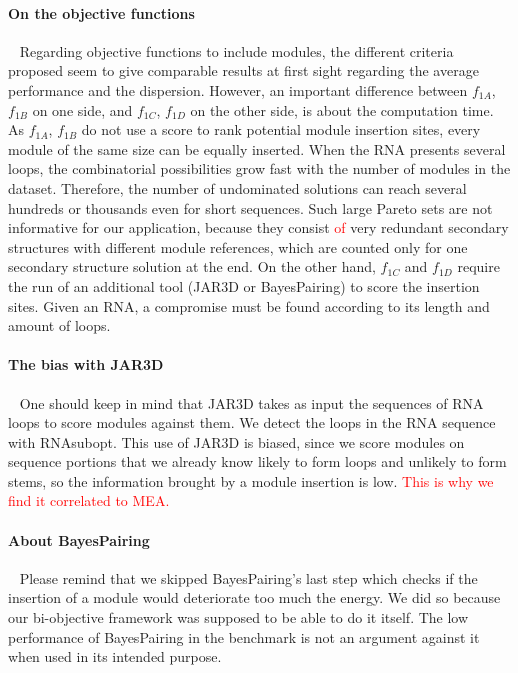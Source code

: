 \documentclass{bioinfo}
\begin{document}
\paragraph{On the objective functions} ~ 
Regarding objective functions to include modules, the different criteria proposed seem to give comparable results at first sight regarding the average performance and the dispersion. However, an important difference between $f_{1A}$, $f_{1B}$ on one side, and $f_{1C}$, $f_{1D}$ on the other side, is about the computation time. As $f_{1A}$, $f_{1B}$ do not use a score to rank potential module insertion sites, every module of the same size can be equally inserted. When the RNA presents several loops, the combinatorial possibilities grow fast with the number of modules in the dataset. Therefore, the number of undominated solutions can reach several hundreds or thousands even for short sequences. Such large Pareto sets are not informative for our application, because they consist \textcolor{red}{of} very redundant secondary structures with different module references, which are counted only for one secondary structure solution at the end. On the other hand, $f_{1C}$ and $f_{1D}$ require the run of an additional tool (JAR3D or BayesPairing) to score the insertion sites. Given an RNA, a compromise must be found according to its length and amount of loops.

\paragraph{The bias with JAR3D} ~ One should keep in mind that JAR3D takes as input the sequences of RNA loops to score modules against them. We detect the loops in the RNA sequence with RNAsubopt. This use of JAR3D is biased, since we score modules on sequence portions that we already know likely to form loops and  unlikely to form stems, so the information brought by a module insertion is low. \textcolor{red}{This is why we find it correlated to MEA.}

\paragraph{About BayesPairing} ~ Please remind that we skipped BayesPairing's last step which checks if the insertion of a module would deteriorate too much the energy. We did so because our bi-objective framework was supposed to be able to do it itself. The low performance of BayesPairing in the benchmark is not an argument against it when used in its intended purpose.
\end{document}
